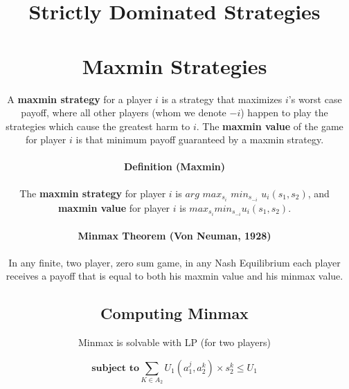 \documentclass[a4paper,12pt]{article}
\begin{document}
\title{\textbf{Strictly Dominated Strategies}
\section{Maxmin Strategies} 
A \textbf{maxmin strategy} for a player $i$ is a strategy that maximizes $i$'s worst case payoff, where all other players (whom we denote $-i$) happen to play the strategies which cause the greatest harm to $i$.
\bigbreak
The \textbf{maxmin value} of the game for player $i$ is that minimum payoff guaranteed by a maxmin strategy.
\paragraph{Definition (Maxmin)}{
The \textbf {maxmin strategy}  for player $i$ is $arg$ $max_{s_i}$ $min_{s_{-i}}$ $u_i(s_1, s_2)$, and \textbf{maxmin value} for player $i$ is $max_{s_i} min_{s_{-i}}u_i(s_1, s_2).$}
\paragraph{Minmax Theorem (Von Neuman, 1928)}{In any finite, two player, zero sum game, in any Nash Equilibrium each player receives a payoff that is equal to both his maxmin value and his minmax value.}
\subsection{Computing Minmax}
Minmax is solvable with LP (for two players)

\begin{equation}\textbf{subject to} \sum_{K \in A_2}U_1(a_1^j, a_2^k)\times s_2^k \leq U_1  \end{equation}
}
\end{document}
